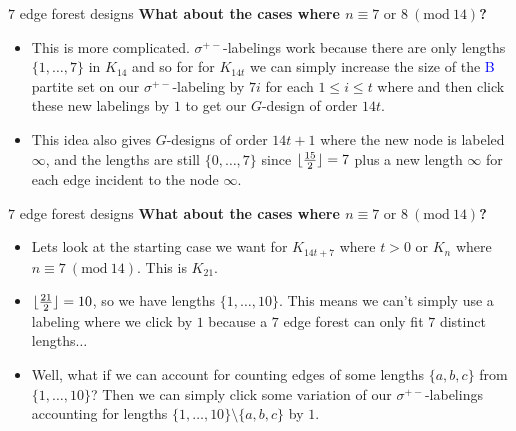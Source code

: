 \documentclass{beamer}
\theoremstyle{plain}
\DeclarePairedDelimiter\floor{\lfloor}{\rfloor} %
\newcommand{\Mod}[1]{\ (\mathrm{mod}\ #1)}
\begin{document}
    \begin{frame}{$7$ edge forest designs}
        \textbf{What about the cases where $n\equiv 7\text{ or }8\Mod{14}$?}
        \pause
        \begin{itemize}
            \item This is more complicated. $\sigma^{+-}$-labelings work because there are only lengths $\{1,\hdots,7\}$ in $K_{14}$ and so for for $K_{14t}$ we can simply increase the size of the \textcolor{blue}{B} partite set on our $\sigma^{+-}$-labeling by $7i$ for each $1\leq i\leq t$ where and then click these new labelings by $1$ to get our $G$-design of order $14t$. 
            \pause
            \item This idea also gives $G$-designs of order $14t+1$ where the new node is labeled $\infty$, and the lengths are still $\{0,\hdots,7\}$ since $\floor{\frac{15}{2}}=7$ plus a new length $\infty$ for each edge incident to the node $\infty$. 

        \end{itemize}

    \end{frame}

    \begin{frame}{$7$ edge forest designs}
        \textbf{What about the cases where $n\equiv 7\text{ or }8\Mod{14}$?}
        \begin{itemize}
            \pause
            
            \item Lets look at the starting case we want for $K_{14t+7}$ where $t>0$ or $K_{n}$ where $n\equiv 7\Mod{14}.$ This is $K_{21}$.
            
            \item $\floor{\frac{21}{2}}=10$, so we have lengths $\{1,\hdots, 10\}$. This means we can't simply use a labeling where we click by $1$ because a $7$ edge forest can only fit $7$ distinct lengths$\hdots$
            
            \item Well, what if we can account for counting edges of some lengths $\{a,b,c\}$ from $\{1,\hdots, 10\}$? Then we can simply click some variation of our $\sigma^{+-}$-labelings accounting for lengths $\{1,\hdots,10\}\setminus \{a,b,c\}$ by $1$. 

        \end{itemize}

    \end{frame}
\end{document}
